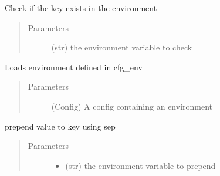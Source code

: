 \documentclass[a4paper,10pt,english]{sphinxmanual}
\begin{document}
\begin{fulllineitems}
\begin{fulllineitems}
\begin{quote}
\begin{description}
\end{description}\end{quote}

\end{fulllineitems}


\begin{fulllineitems}
\label{\detokenize{apidoc_src/src:src.environment.SalomeEnviron.is_defined}}
Check if the key exists in the environment
\begin{quote}\begin{description}
\item[{Parameters}] \leavevmode
{} \textendash{} (str) the environment variable to check

\end{description}\end{quote}

\end{fulllineitems}


\begin{fulllineitems}
\label{\detokenize{apidoc_src/src:src.environment.SalomeEnviron.load_cfg_environment}}
Loads environment defined in cfg\_env
\begin{quote}\begin{description}
\item[{Parameters}] \leavevmode
{} \textendash{} (Config) A config containing an environment

\end{description}\end{quote}

\end{fulllineitems}


\begin{fulllineitems}
\label{\detokenize{apidoc_src/src:src.environment.SalomeEnviron.prepend}}
prepend value to key using sep
\begin{quote}\begin{description}
\item[{Parameters}] \leavevmode\begin{itemize}
\item {} 
 \textendash{} (str) the environment variable to prepend


\end{itemize}
\end{description}
\end{quote}
\end{fulllineitems}
\end{fulllineitems}
\end{document}

